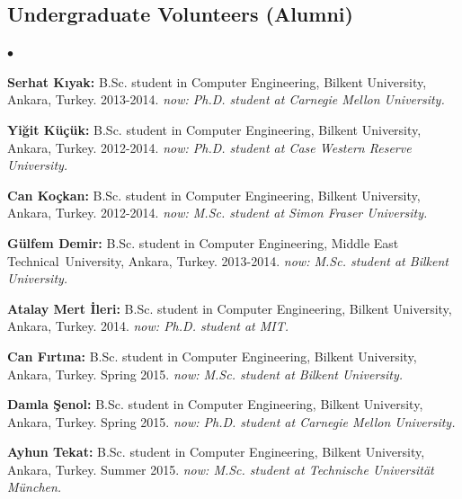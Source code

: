 \documentclass[margin,line]{res}
\newenvironment{list2}{
  \begin{list}{$\bullet$}{%
      \setlength{\itemsep}{0in}
      \setlength{\parsep}{0in} \setlength{\parskip}{0in}
      \setlength{\topsep}{0in} \setlength{\partopsep}{0in} 
      \setlength{\leftmargin}{0.2in}}}{\end{list}}
\begin{document}
\begin{resume}
\subsection{\small \sc Undergraduate Volunteers (Alumni)}
\begin{list2}
\item {\bf Serhat Kıyak:} B.Sc. student in Computer Engineering,  Bilkent University, Ankara, Turkey. 2013-2014. {\it now: Ph.D. student at Carnegie Mellon University.}
\item {\bf Yiğit Küçük:} B.Sc. student in Computer Engineering,  Bilkent University, Ankara, Turkey. 2012-2014. {\it now: Ph.D. student at Case Western Reserve University.}
\item {\bf Can Koçkan:} B.Sc. student in Computer Engineering,  Bilkent University, Ankara, Turkey.  2012-2014. {\it now: M.Sc. student at Simon Fraser University.}
\item {\bf Gülfem Demir:} B.Sc. student in Computer Engineering,  Middle East Technical\ University, Ankara, Turkey. 2013-2014. {\it now: M.Sc. student at Bilkent University.}
\item {\bf Atalay Mert İleri:} B.Sc. student in Computer Engineering, Bilkent University, Ankara, Turkey. 2014. {\it now: Ph.D. student at MIT.}
\item {\bf Can Fırtına:} B.Sc. student in Computer Engineering,  Bilkent University, Ankara, Turkey. Spring 2015. {\it now: M.Sc. student at Bilkent University.} 
\item {\bf Damla Şenol:} B.Sc. student in Computer Engineering,  Bilkent University, Ankara, Turkey. Spring 2015. {\it now: Ph.D. student at Carnegie Mellon University.}
\item  {\bf Ayhun Tekat:} B.Sc. student in Computer Engineering,  Bilkent University, Ankara, Turkey. Summer 2015. {\it now: M.Sc. student at Technische Universität München.}
\end{list2}

\clearpage
\vspace*{-.6cm}

\end{resume}
\end{document}
